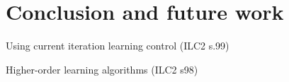 \chapter{Conclusion and future work}
Using current iteration learning control (ILC2 s.99)

Higher-order learning algorithms (ILC2 s98)
